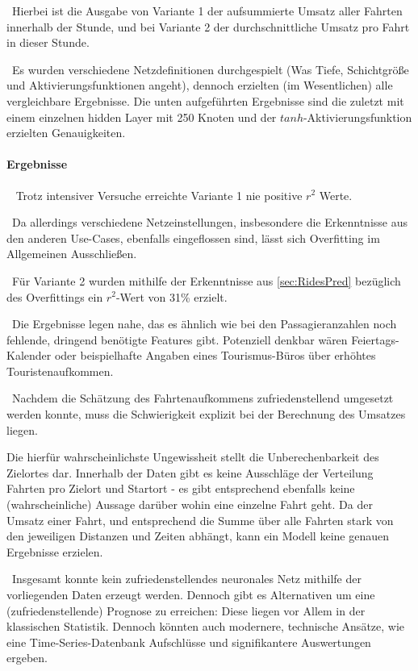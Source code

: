 ~\newline Hierbei ist die Ausgabe von Variante 1 der aufsummierte Umsatz aller Fahrten innerhalb der Stunde, und bei Variante 2 der durchschnittliche Umsatz pro Fahrt in dieser Stunde. 

~\newline Es wurden verschiedene Netzdefinitionen durchgespielt (Was Tiefe, Schichtgröße und Aktivierungsfunktionen angeht), dennoch erzielten (im Wesentlichen) alle vergleichbare Ergebnisse. Die unten aufgeführten Ergebnisse sind die zuletzt mit einem einzelnen hidden Layer mit 250 Knoten und der $tanh$-Aktivierungsfunktion erzielten Genauigkeiten.
\paragraph{Ergebnisse} ~\newline
Trotz intensiver Versuche erreichte Variante 1 nie positive $r^2$ Werte. 

~\newline Da allerdings verschiedene Netzeinstellungen, insbesondere die Erkenntnisse aus den anderen Use-Cases, ebenfalls eingeflossen sind, lässt sich Overfitting im Allgemeinen Ausschließen. 

~\newline Für Variante 2 wurden mithilfe der Erkenntnisse aus \ref{sec:RidesPred} bezüglich des Overfittings ein $r^2$-Wert von 31\% erzielt.

~\newline Die Ergebnisse legen nahe, das es ähnlich wie bei den Passagieranzahlen noch fehlende, dringend benötigte Features gibt. Potenziell denkbar wären Feiertags-Kalender oder beispielhafte Angaben eines Tourismus-Büros über erhöhtes Touristenaufkommen.  

~\newline Nachdem die Schätzung des Fahrtenaufkommens zufriedenstellend umgesetzt werden konnte, muss die Schwierigkeit explizit bei der Berechnung des Umsatzes liegen. 

Die hierfür wahrscheinlichste Ungewissheit stellt die Unberechenbarkeit des Zielortes dar. Innerhalb der Daten gibt es keine Ausschläge der Verteilung Fahrten pro Zielort und Startort - es gibt entsprechend ebenfalls keine (wahrscheinliche) Aussage darüber wohin eine einzelne Fahrt geht. Da der Umsatz einer Fahrt, und entsprechend die Summe über alle Fahrten stark von den jeweiligen Distanzen und Zeiten abhängt, kann ein Modell keine genauen Ergebnisse erzielen.

~\newline Insgesamt konnte kein zufriedenstellendes neuronales Netz mithilfe der vorliegenden Daten erzeugt werden. Dennoch gibt es Alternativen um eine (zufriedenstellende) Prognose zu erreichen: Diese liegen vor Allem in der klassischen Statistik. Dennoch könnten auch modernere, technische Ansätze, wie eine Time-Series-Datenbank Aufschlüsse und signifikantere Auswertungen ergeben.  